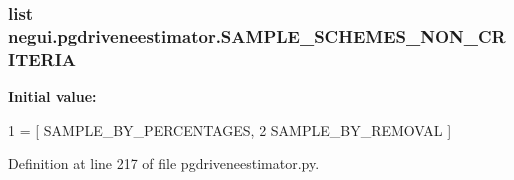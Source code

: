 \subsubsection[{\texorpdfstring{S\+A\+M\+P\+L\+E\+\_\+\+S\+C\+H\+E\+M\+E\+S\+\_\+\+N\+O\+N\+\_\+\+C\+R\+I\+T\+E\+R\+IA}{SAMPLE_SCHEMES_NON_CRITERIA}}]{\setlength{\rightskip}{0pt plus 5cm}list negui.\+pgdriveneestimator.\+S\+A\+M\+P\+L\+E\+\_\+\+S\+C\+H\+E\+M\+E\+S\+\_\+\+N\+O\+N\+\_\+\+C\+R\+I\+T\+E\+R\+IA}\hypertarget{namespacenegui_1_1pgdriveneestimator_a2d9d6cbe867f7222f090e8fa43d5c04d}{}\label{namespacenegui_1_1pgdriveneestimator_a2d9d6cbe867f7222f090e8fa43d5c04d}
{\bfseries Initial value\+:}
\begin{DoxyCode}
1 = [ SAMPLE\_BY\_PERCENTAGES, 
2                                     SAMPLE\_BY\_REMOVAL ]
\end{DoxyCode}


Definition at line 217 of file pgdriveneestimator.\+py.

